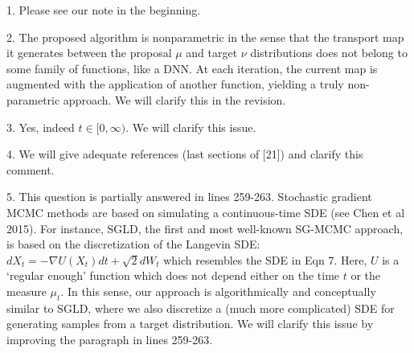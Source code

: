 \documentclass{article}
\newcommand{\rev}[1]{{\color{red} #1}}
\newcommand{\alain}[1]{{\color{cyan} #1}}
\begin{document}
1. Please see our note in the beginning. 


2. The proposed algorithm is nonparametric in the sense that the transport map it generates between the proposal $\mu$ and target $\nu$ distributions does not belong to some family of functions, like a DNN. At each iteration, the current map is augmented with the application of another function, yielding a truly non-parametric approach. We will clarify this in the revision.


3. Yes, indeed $t \in [0, \infty)$. We will clarify this issue.


4. We will give adequate references (last sections of [21]) and clarify this comment.



5. This question is partially answered in lines 259-263. Stochastic gradient MCMC methods are based on simulating a continuous-time SDE (see Chen et al 2015). For instance, SGLD, the first and most well-known SG-MCMC approach, is based on the discretization of the Langevin SDE: $d X_t = - \nabla U(X_t) dt + \sqrt{2} dW_t$ which resembles the SDE in Eqn 7. Here, $U$ is a `regular enough' function which does not depend either on the time $t$ or the measure $\mu_t$. In this sense, our approach is algorithmically and conceptually similar to SGLD, where we also discretize a (much more complicated) SDE for generating samples from a target distribution. We will clarify this issue by improving the paragraph in lines 259-263.
\end{document}
